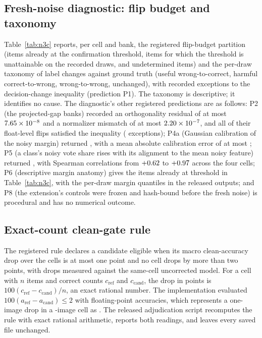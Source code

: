 \subsection{Fresh-noise diagnostic: flip budget and taxonomy}



Table~\ref{tab:n3c} reports, per cell and bank, the registered flip-budget
partition (items already at the confirmation threshold, items for which the
threshold is unattainable on the recorded draws, and undetermined items) and the
per-draw taxonomy of label changes against ground truth (useful
wrong-to-correct, harmful correct-to-wrong, wrong-to-wrong, unchanged), with
\NthreeCPone{} recorded exceptions to the decision-change inequality
(prediction P1). The taxonomy is descriptive; it identifies no cause. The
diagnostic's other registered predictions are as follows: P2 (the projected-gap banks) recorded an orthogonality
residual of at most $7.65\times10^{-8}$ and a normalizer mismatch of at most
$2.20\times10^{-7}$, and all \NthreeCPtwoFlips{} of their float-level flips
satisfied the inequality (\NthreeCPtwoExceptions{} exceptions); P4a (Gaussian
calibration of the noisy margin) returned \emph{\NthreeCPfourAVerdict}, with a
mean absolute calibration error of at most \NthreeCPfourAMax{}; P5 (a class's
noisy vote share rises with its alignment to the mean noisy feature) returned
\emph{\NthreeCPfiveVerdict}, with Spearman correlations from $+0.62$
to $+0.97$ across the four cells; P6 (descriptive margin anatomy)
gives the items already at threshold in Table~\ref{tab:n3c}, with the per-draw
margin quantiles in the released outputs; and P8 (the extension's controls were
frozen and hash-bound before the fresh noise) is procedural and has no
numerical outcome.

\subsection{Exact-count clean-gate rule}

The registered rule declares a candidate eligible when its macro clean-accuracy
drop over the \ExpCells{} cells is at most one point and no cell drops by more
than two points, with drops measured against the same-cell uncorrected model.
For a cell with $n$ items and correct counts $c_{\mathrm{ref}}$ and
$c_{\mathrm{cand}}$, the drop in points is $100(c_{\mathrm{ref}}-c_{\mathrm{cand}})/n$,
an exact rational number. The implementation evaluated $100(a_{\mathrm{ref}}-a_{\mathrm{cand}})\le2$
with floating-point accuracies, which represents a one-image drop in a
\ExpEurosatItemsPerCell-image cell as \FloatGateArtifact{}. The released
adjudication script recomputes the rule with exact rational arithmetic, reports
both readings, and leaves every saved file unchanged.

